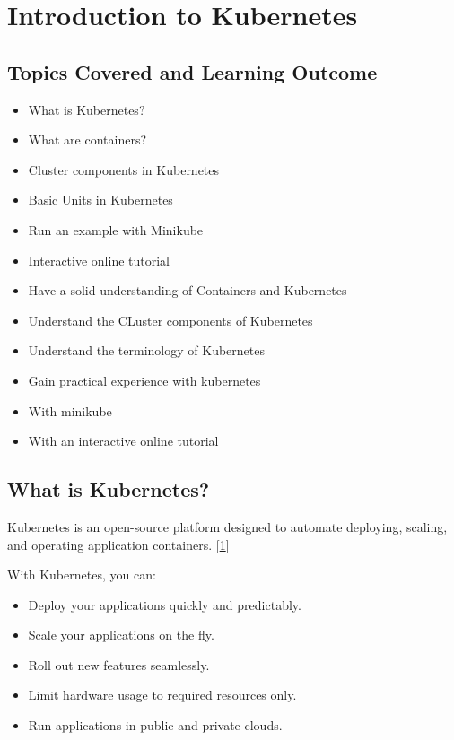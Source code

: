 \section{Introduction to Kubernetes}\label{introduction-to-kubernetes}

\subsection{Topics Covered and Learning
Outcome}\label{topics-covered-and-learning-outcome-1}

\begin{itemize}

\item
  What is Kubernetes?
\item
  What are containers?
\item
  Cluster components in Kubernetes
\item
  Basic Units in Kubernetes
\item
  Run an example with Minikube
\item
  Interactive online tutorial
\item
  Have a solid understanding of Containers and Kubernetes
\item
  Understand the CLuster components of Kubernetes
\item
  Understand the terminology of Kubernetes
\item
  Gain practical experience with kubernetes
\item
  With minikube
\item
  With an interactive online tutorial
\end{itemize}

\subsection{What is Kubernetes?}\label{what-is-kubernetes}

Kubernetes is an open-source platform designed to automate deploying,
scaling, and operating application containers.
{[}\href{https://kubernetes.io/docs/concepts/overview/what-is-kubernetes/}{1}{]}

With Kubernetes, you can:

\begin{itemize}

\item
  Deploy your applications quickly and predictably.
\item
  Scale your applications on the fly.
\item
  Roll out new features seamlessly.
\item
  Limit hardware usage to required resources only.
\item
  Run applications in public and private clouds.
\end{itemize}

